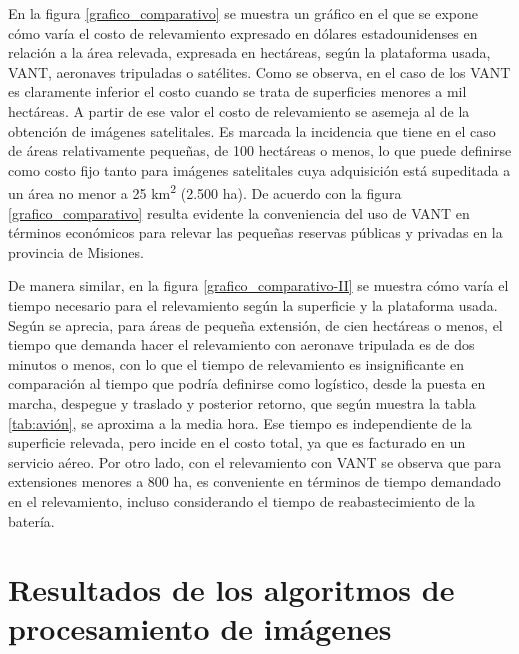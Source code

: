 En la figura \ref{grafico_comparativo} se muestra un gráfico en el que se expone cómo varía el costo de relevamiento expresado en dólares estadounidenses en relación a la área relevada, expresada en hectáreas, según la plataforma usada, VANT, aeronaves tripuladas o satélites. Como se observa, en el caso de los VANT es claramente inferior el costo cuando se trata de superficies menores a mil hectáreas. A partir de ese valor el costo de relevamiento se asemeja al de la obtención de imágenes satelitales. Es marcada la incidencia que tiene en el caso de áreas relativamente pequeñas, de 100 hectáreas o menos, lo que puede definirse como costo fijo tanto para imágenes satelitales cuya adquisición está supeditada a un área no menor a 25 km\textsuperscript{2} (2.500 ha). De acuerdo con la figura \ref{grafico_comparativo} resulta evidente la conveniencia del uso de VANT en términos económicos para relevar las pequeñas reservas públicas y privadas en la provincia de Misiones.

De manera similar, en la figura \ref{grafico_comparativo-II} se muestra cómo varía el tiempo necesario para el relevamiento según la superficie y la plataforma usada. Según se aprecia, para áreas de pequeña extensión, de cien hectáreas o menos, el tiempo que demanda hacer el relevamiento con aeronave tripulada es de dos minutos o menos, con lo que el tiempo de relevamiento es insignificante en comparación al tiempo que podría definirse como logístico, desde la puesta en marcha, despegue y traslado y posterior retorno, que según muestra la tabla \ref{tab:avión}, se aproxima a la media hora. Ese tiempo es independiente de la superficie relevada, pero incide en el costo total, ya que es facturado en un servicio aéreo. Por otro lado, con el relevamiento con VANT se observa que para extensiones menores a 800 ha, es conveniente en términos de tiempo demandado en el relevamiento, incluso considerando el tiempo de reabastecimiento de la batería.

\section{Resultados de los algoritmos de procesamiento de imágenes}
